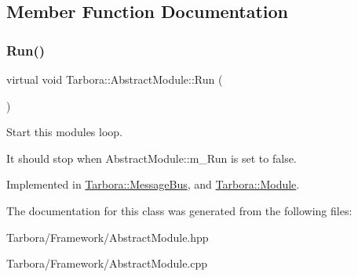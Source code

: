\subsection{Member Function Documentation}
\mbox{\label{classTarbora_1_1AbstractModule_abc4de331276ff78b18efafe14498bf21}} 
\subsubsection{\texorpdfstring{Run()}{Run()}}
{\footnotesize\ttfamily virtual void Tarbora\+::\+Abstract\+Module\+::\+Run (\begin{DoxyParamCaption}{ }\end{DoxyParamCaption})\hspace{0.3cm}{\ttfamily [pure virtual]}}



Start this module\textquotesingle{}s loop. 

It should stop when Abstract\+Module\+::m\+\_\+\+Run is set to false. 

Implemented in \hyperlink{classTarbora_1_1MessageBus_a1de6d06fd522da0c19c4b4889a26e5dd}{Tarbora\+::\+Message\+Bus}, and \hyperlink{classTarbora_1_1Module_a62a1e7435f81e085354cbe603a023aee}{Tarbora\+::\+Module}.



The documentation for this class was generated from the following files\+:\begin{DoxyCompactItemize}
\item 
Tarbora/\+Framework/Abstract\+Module.\+hpp\item 
Tarbora/\+Framework/Abstract\+Module.\+cpp\end{DoxyCompactItemize}
